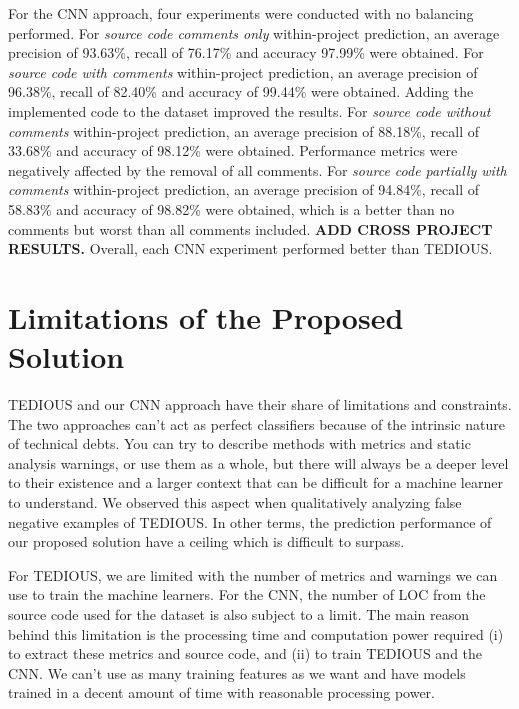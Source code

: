 For the CNN approach, four experiments were conducted with no balancing performed. For \textit{source code comments only} within-project prediction, an average precision of 93.63\%, recall of 76.17\% and accuracy 97.99\% were obtained. For \textit{source code with comments} within-project prediction, an average precision of 96.38\%, recall of 82.40\% and accuracy of 99.44\% were obtained. Adding the implemented code to the dataset improved the results. For \textit{source code without comments} within-project prediction, an average precision of 88.18\%, recall of 33.68\% and accuracy of 98.12\% were obtained. Performance metrics were negatively affected by the removal of all comments. For \textit{source code partially with comments} within-project prediction, an average precision of 94.84\%, recall of 58.83\% and accuracy of 98.82\% were obtained, which is a better than no comments but worst than all comments included. \textbf{ADD CROSS PROJECT RESULTS.} Overall, each CNN experiment performed better than TEDIOUS.

\section{Limitations of the Proposed Solution}\label{sec:Limitations}


TEDIOUS and our CNN approach have their share of limitations and constraints. The two approaches can't act as perfect classifiers because of the intrinsic nature of technical debts. You can try to describe methods with metrics and static analysis warnings, or use them as a whole, but there will always be a deeper level to their existence and a larger context that can be difficult for a machine learner to understand. We observed this aspect when qualitatively analyzing false negative examples of TEDIOUS. In other terms, the prediction performance of our proposed solution have a ceiling which is difficult to surpass.

For TEDIOUS, we are limited with the number of metrics and warnings we can use to train the machine learners. For the CNN, the number of LOC from the source code used for the dataset is also subject to a limit. The main reason behind this limitation is the processing time and computation power required (i) to extract these metrics and source code, and (ii) to train TEDIOUS and the CNN. We can't use as many training features as we want and have models trained in a decent amount of time with reasonable processing power.

